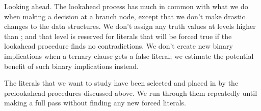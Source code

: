 Looking ahead. The lookahead process has much in common with what
we do when making a decision at a branch node, except that we
don't make drastic changes to the data structures. We don't
assign any truth values at levels higher than ; and
that level is reserved for literals that will be forced true if the
lookahead procedure finds no contradictions. We don't create
new binary implications when a ternary clause gets a false literal;
we estimate the potential benefit of such binary implications instead.

The literals that we want to study have been selected and placed in 
by the prelookahead procedures discussed above. We run through them
repeatedly until making a full pass without finding any new forced literals.

